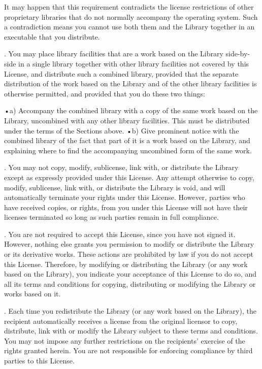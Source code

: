 It may happen that this requirement contradicts the license restrictions of other proprietary libraries that do not normally accompany the operating system. Such a contradiction means you cannot use both them and the Library together in an executable that you distribute. 

. You may place library facilities that are a work based on the Library side-by-side in a single library together with other library facilities not covered by this License, and distribute such a combined library, provided that the separate distribution of the work based on the Library and of the other library facilities is otherwise permitted, and provided that you do these two things: 

•a) Accompany the combined library with a copy of the same work based on the Library, uncombined with any other library facilities. This must be distributed under the terms of the Sections above. 
•b) Give prominent notice with the combined library of the fact that part of it is a work based on the Library, and explaining where to find the accompanying uncombined form of the same work. 

. You may not copy, modify, sublicense, link with, or distribute the Library except as expressly provided under this License. Any attempt otherwise to copy, modify, sublicense, link with, or distribute the Library is void, and will automatically terminate your rights under this License. However, parties who have received copies, or rights, from you under this License will not have their licenses terminated so long as such parties remain in full compliance. 

. You are not required to accept this License, since you have not signed it. However, nothing else grants you permission to modify or distribute the Library or its derivative works. These actions are prohibited by law if you do not accept this License. Therefore, by modifying or distributing the Library (or any work based on the Library), you indicate your acceptance of this License to do so, and all its terms and conditions for copying, distributing or modifying the Library or works based on it. 

. Each time you redistribute the Library (or any work based on the Library), the recipient automatically receives a license from the original licensor to copy, distribute, link with or modify the Library subject to these terms and conditions. You may not impose any further restrictions on the recipients' exercise of the rights granted herein. You are not responsible for enforcing compliance by third parties to this License. 

